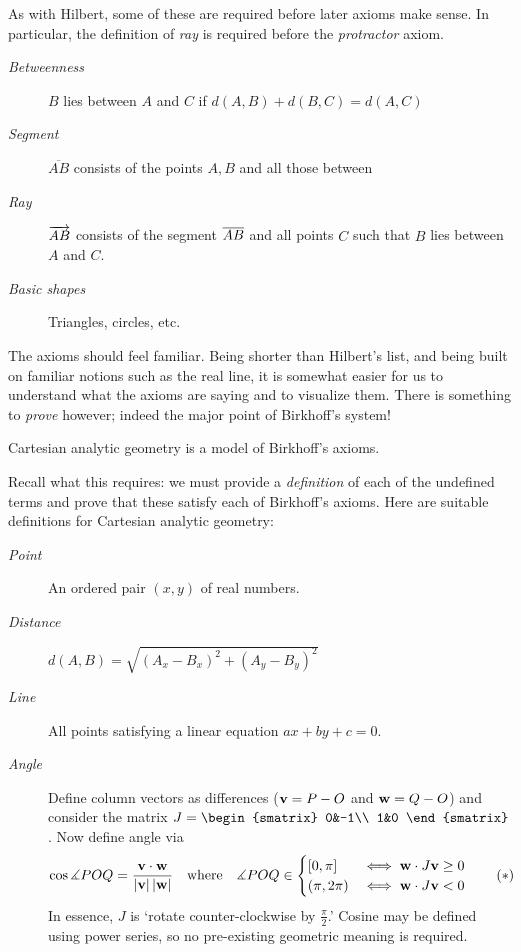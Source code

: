  As with Hilbert, some of these are required before later axioms make sense. In particular, the definition of \emph{ray} is required before the \emph{protractor} axiom.
\begin{description}
	\item[\normalfont\emph{Betweenness}] $B$ lies between $A$ and $C$ if $d(A,B)+d(B,C)=d(A,C)$
  \item[\normalfont\emph{Segment}] $\overline{AB}$ consists of the points $A,B$ and all those between
  \item[\normalfont\emph{Ray}] $\overrightarrow{AB}$ consists of the segment $\overline{AB}$ and all points $C$ such that $B$ lies between $A$ and $C$.
  \item[\normalfont\emph{Basic shapes}] Triangles, circles, etc.
\end{description}




The axioms should feel familiar. Being shorter than Hilbert's list, and being built on familiar notions such as the real line, it is somewhat easier for us to understand what the axioms are saying and to visualize them. There is something to \emph{prove} however; indeed the major point of Birkhoff's system!

\begin{thm}{}{}
	Cartesian analytic geometry is a model of Birkhoff's axioms.
\end{thm}

Recall what this requires: we must provide a \emph{definition} of each of the undefined terms and prove that these satisfy each of Birkhoff's axioms. Here are suitable definitions for Cartesian analytic geometry:
\begin{description}
	\item[\normalfont\emph{Point}] An ordered pair $(x,y)$ of real numbers.
	\item[\normalfont\emph{Distance}] $d(A,B)=\sqrt{(A_x-B_x)^2+(A_y-B_y)^2}$
	\item[\normalfont\emph{Line}] All points satisfying a linear equation $ax+by+c=0$.
	\item[\normalfont\emph{Angle}] Define column vectors as differences (${\mathbf{v}}=P-O$ and ${\mathbf{w}}=Q-O$) and consider the matrix $J=
	\begin{smatrix}
		0&-1\\
		1&0
	\end{smatrix}$. 
	Now define angle via
	\[
		\cos\measuredangle POQ=\frac{{\mathbf{v}}\cdot{\mathbf{w}}}{\left| {\mathbf{v}}\right|\left| {\mathbf{w}}\right|}
		\quad\text{where}\quad
		\measuredangle POQ\in
		\begin{cases}
			[0,\pi]&\iff{\mathbf{w}}\cdot J{\mathbf{v}}\ge 0\\
			(\pi,2\pi)&\iff{\mathbf{w}}\cdot J{\mathbf{v}}< 0
		\end{cases}
		\tag{$\ast$}
	\]
	In essence, $J$ is `rotate counter-clockwise by $\frac\pi 2$.' Cosine may be defined using power series, so no pre-existing geometric meaning is required.
\end{description}

